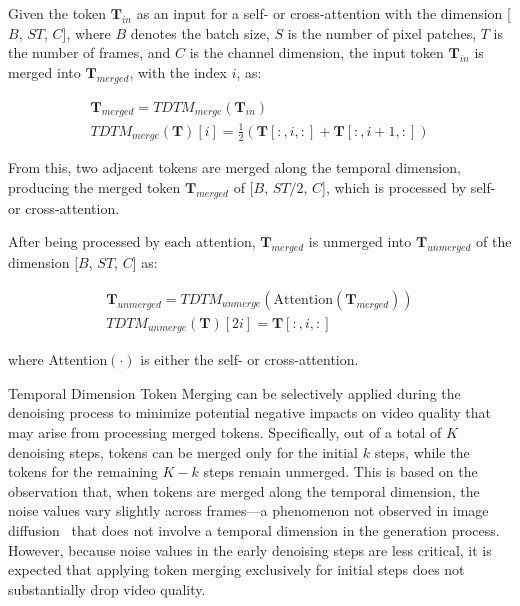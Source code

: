 \iffalse
\begin{figure}[!t]
    \centering
    \texttt{[image: figures/TDTM\_Example.pdf]}
    \caption{An illustration of the token merging and unmerging process over the temporal dimension.}
    \label{fig:TDTM-Example}
\end{figure}
\fi

Given the token $\boldsymbol{T}_{in}$ as an input for a self- or cross-attention with the dimension [$B$, $ST$, $C$], where $B$ denotes the batch size, $S$ is the number of pixel patches, $T$ is the number of frames, and $C$ is the channel dimension, the input token $\boldsymbol{T}_{in}$ is merged into $\boldsymbol{T}_{merged}$, with the index $i$, as:

\begin{gather}
    \boldsymbol{T}_{merged} = TDTM_{merge}(\boldsymbol{T}_{in})
    \\    
    TDTM_{merge}(\boldsymbol{T})[i] = \frac{1}{2} (\boldsymbol{T}[:,i,:] + \boldsymbol{T}[:,i+1,:])
\end{gather}

\noindent From this, two adjacent tokens are merged along the temporal dimension, producing the merged token $\boldsymbol{T}_{merged}$ of [$B$, $ST/2$, $C$], which is processed by self- or cross-attention.

After being processed by each attention, $\boldsymbol{T}_{merged}$ is unmerged into $\boldsymbol{T}_{unmerged}$ of the dimension [$B$, $ST$, $C$] as:

\begin{gather}
    \boldsymbol{T}_{unmerged} = TDTM_{unmerge}(\text{Attention}(\boldsymbol{T}_{merged}))
    \\
    TDTM_{unmerge}(\boldsymbol{T})[2i]= \boldsymbol{T}[:,i,:]
\end{gather}

\noindent where Attention$(\cdot)$ is either the self- or cross-attention. 



Temporal Dimension Token Merging can be selectively applied during the denoising process to minimize potential negative impacts on video quality that may arise from processing merged tokens. Specifically, out of a total of $K$ denoising steps, tokens can be merged only for the initial $k$ steps, while the tokens for the remaining $K{-}k$ steps remain unmerged. This is based on the observation that, when tokens are merged along the temporal dimension, the noise values vary slightly across frames—a phenomenon not observed in image diffusion~\cite{saharia2022palette} that does not involve a temporal dimension in the generation process. However, because noise values in the early denoising steps are less critical, it is expected that applying token merging exclusively for initial steps does not substantially drop video quality.
